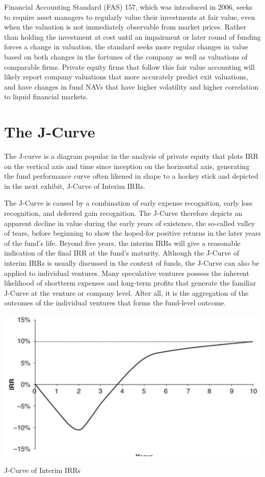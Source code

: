 \documentclass[11pt]{article}
\begin{document}
Financial Accounting Standard (FAS) 157, which was introduced in 2006, seeks to require asset managers to regularly value their investments at fair value, even when the valuation is not immediately observable from market prices. Rather than holding the investment at cost until an impairment or later round of funding forces a change in valuation, the standard seeks more regular changes in value based on both changes in the fortunes of the company as well as valuations of comparable firms. Private equity firms that follow this fair value accounting will likely report company valuations that more accurately predict exit valuations, and have changes in fund NAVs that have higher volatility and higher correlation to liquid financial markets.

\section*{The J-Curve}
The J-curve is a diagram popular in the analysis of private equity that plots IRR on the vertical axis and time since inception on the horizontal axis, generating the fund performance curve often likened in shape to a hockey stick and depicted in the next exhibit, J-Curve of Interim IRRs.

The J-Curve is caused by a combination of early expense recognition, early loss recognition, and deferred gain recognition. The J-Curve therefore depicts an apparent decline in value during the early years of existence, the so-called valley of tears, before beginning to show the hoped-for positive returns in the later years of the fund's life. Beyond five years, the interim IRRs will give a reasonable indication of the final IRR at the fund's maturity. Although the J-Curve of interim IRRs is usually discussed in the context of funds, the J-Curve can also be applied to individual ventures. Many speculative ventures possess the inherent likelihood of shortterm expenses and long-term profits that generate the familiar J-Curve at the venture or company level. After all, it is the aggregation of the outcomes of the individual ventures that forms the fund-level outcome.

\begin{center}
\includegraphics[max width=\textwidth]{2024_04_10_3693761da65f19bde100g-2}
\end{center}

J-Curve of Interim IRRs
\end{document}
